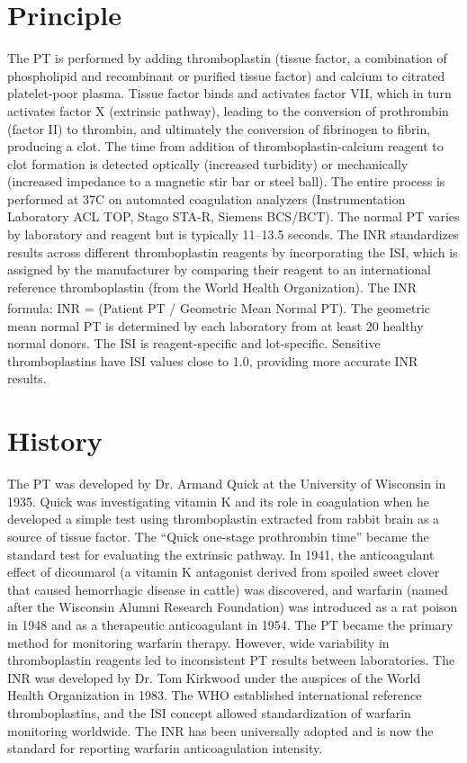 \section*{Principle}
The PT is performed by adding thromboplastin (tissue factor, a combination of phospholipid and recombinant or purified tissue factor) and calcium to citrated platelet-poor plasma. Tissue factor binds and activates factor VII, which in turn activates factor X (extrinsic pathway), leading to the conversion of prothrombin (factor II) to thrombin, and ultimately the conversion of fibrinogen to fibrin, producing a clot. The time from addition of thromboplastin-calcium reagent to clot formation is detected optically (increased turbidity) or mechanically (increased impedance to a magnetic stir bar or steel ball). The entire process is performed at 37\textdegree{}C on automated coagulation analyzers (Instrumentation Laboratory ACL TOP, Stago STA-R, Siemens BCS/BCT). The normal PT varies by laboratory and reagent but is typically 11--13.5 seconds. The INR standardizes results across different thromboplastin reagents by incorporating the ISI, which is assigned by the manufacturer by comparing their reagent to an international reference thromboplastin (from the World Health Organization). The INR formula: INR = (Patient PT / Geometric Mean Normal PT)\textsuperscript{}. The geometric mean normal PT is determined by each laboratory from at least 20 healthy normal donors. The ISI is reagent-specific and lot-specific. Sensitive thromboplastins have ISI values close to 1.0, providing more accurate INR results.

\section*{History}
The PT was developed by Dr. Armand Quick at the University of Wisconsin in 1935. Quick was investigating vitamin K and its role in coagulation when he developed a simple test using thromboplastin extracted from rabbit brain as a source of tissue factor. The ``Quick one-stage prothrombin time'' became the standard test for evaluating the extrinsic pathway. In 1941, the anticoagulant effect of dicoumarol (a vitamin K antagonist derived from spoiled sweet clover that caused hemorrhagic disease in cattle) was discovered, and warfarin (named after the Wisconsin Alumni Research Foundation) was introduced as a rat poison in 1948 and as a therapeutic anticoagulant in 1954. The PT became the primary method for monitoring warfarin therapy. However, wide variability in thromboplastin reagents led to inconsistent PT results between laboratories. The INR was developed by Dr. Tom Kirkwood under the auspices of the World Health Organization in 1983. The WHO established international reference thromboplastins, and the ISI concept allowed standardization of warfarin monitoring worldwide. The INR has been universally adopted and is now the standard for reporting warfarin anticoagulation intensity.

